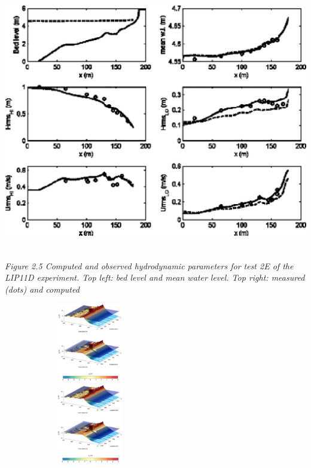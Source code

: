 \documentclass{article}
\begin{document}
\noindent 

\noindent 

\noindent \textbf{\textit{\includegraphics*[width=5.92in, height=4.48in, keepaspectratio=false, trim=0.00in 0.08in 0.02in 0.00in]{image15}}}\textit{}

\noindent \textit{Figure 2.5 Computed and observed hydrodynamic parameters for test 2E of the LIP11D experiment. Top left: bed level and mean water level. Top right: measured (dots) and computed}

\noindent 

\noindent 

\noindent \includegraphics*[width=2.95in, height=1.35in, keepaspectratio=false, trim=0.05in 2.26in 0.14in 0.13in]{image16}\includegraphics*[width=2.96in, height=1.38in, keepaspectratio=false, trim=0.04in 0.71in 0.17in 1.68in]{image17}
\end{document}
